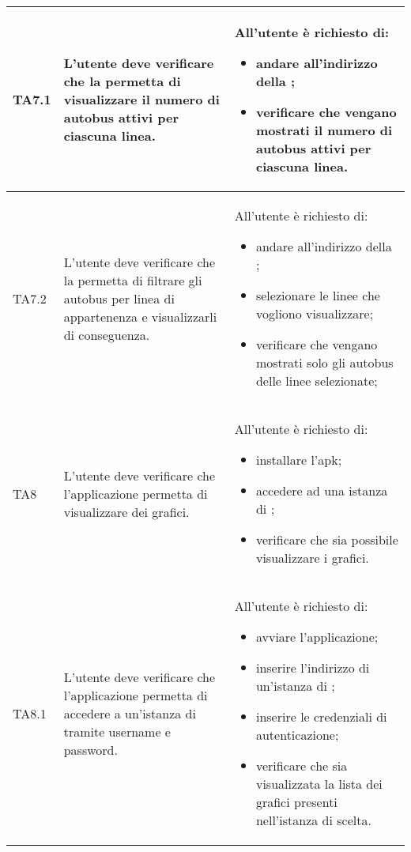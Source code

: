 \begin{longtabu}{| X[0.5] | X | X |}
	TA7.1 & L'utente deve verificare che la  permetta di visualizzare il numero di autobus attivi per ciascuna linea.

		& All'utente è richiesto di:
		\begin{itemize}
			\item andare all'indirizzo della ;
			\item verificare che vengano mostrati il numero di autobus attivi per ciascuna linea.
		\end{itemize}
\\ \hline

	TA7.2 & L'utente deve verificare che la  permetta di filtrare gli autobus per linea di appartenenza e visualizzarli di conseguenza.

		& All'utente è richiesto di:
		\begin{itemize}
			\item andare all'indirizzo della ;
			\item selezionare le linee che vogliono visualizzare;
			\item verificare che vengano mostrati solo gli autobus delle linee selezionate;
		\end{itemize}
\\ \hline

	TA8 & L'utente deve verificare che l'applicazione  permetta di visualizzare dei grafici.

		& All'utente è richiesto di:
		\begin{itemize}
			\item installare l'apk;
			\item accedere ad una istanza di \projectname{};
			\item verificare che sia possibile visualizzare i grafici.
		\end{itemize}
\\ \hline

	TA8.1 & L'utente deve verificare che l'applicazione  permetta di accedere a un'istanza di \projectname{} tramite username e password.

		& All'utente è richiesto di:
		\begin{itemize}
			\item avviare l'applicazione;
			\item inserire l'indirizzo di un'istanza di \projectname{};
			\item inserire le credenziali di autenticazione;
			\item verificare che sia visualizzata la lista dei grafici presenti nell'istanza di \projectname{} scelta.
		\end{itemize}
\\ \hline


\end{longtabu}
